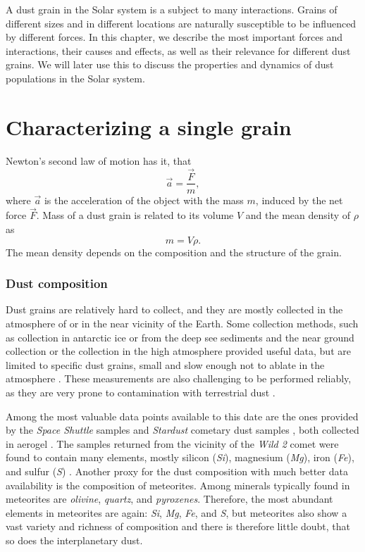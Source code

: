 A dust grain in the Solar system is a subject to many interactions. Grains of different sizes and in different locations are naturally susceptible to be influenced by different forces. In this chapter, we describe the most important forces and interactions, their causes and effects, as well as their relevance for different dust grains. We will later use this to discuss the properties and dynamics of dust populations in the Solar system. 

\section{Characterizing a single grain}

Newton's second law of motion has it, that
\begin{equation}
\vec{a} = \frac{\vec{F}}{m},
\end{equation}
where $\vec{a}$ is the acceleration of the object with the mass $m$, induced by the net force $\vec{F}$. Mass of a dust grain is related to its volume $V$ and the mean density of $\rho$ as
\begin{equation}
    m = V \rho.
\end{equation}
The mean density depends on the composition and the structure of the grain. 

\subsubsection{Dust composition}

Dust grains are relatively hard to collect, and they are mostly collected in the atmosphere of or in the near vicinity of the Earth. Some collection methods, such as collection in antarctic ice or from the deep see sediments \citep{brownlee1985cosmic} and the near ground collection \citep{pettersson1958rate} or the collection in the high atmosphere \citep{fechtig1968results} provided useful data, but are limited to specific dust grains, small and slow enough not to ablate in the atmosphere \cite{vondrak2008chemical}. These measurements are also challenging to be performed reliably, as they are very prone to contamination with terrestrial dust \citep{taylor2016cosmic}. 

Among the most valuable data points available to this date are the ones provided by the \textit{Space Shuttle} samples \citep{mcdonnell1984cosmic} and \textit{Stardust} cometary dust samples \citep{brownlee2014stardust}, both collected in aerogel \citep{tsou1995silica}. The samples returned from the vicinity of the \textit{Wild 2} comet were found to contain many elements, mostly silicon (\textit{Si}), magnesium (\textit{Mg}), iron (\textit{Fe}), and sulfur (\textit{S}) \citep{keller2006infrared}. Another proxy for the dust composition with much better data availability is the composition of meteorites. Among minerals typically found in meteorites are \textit{olivine}, \textit{quartz}, and \textit{pyroxenes}. Therefore, the most abundant elements in meteorites are again: \textit{Si}, \textit{Mg}, \textit{Fe}, and \textit{S}, but meteorites also show a vast variety and richness of composition \citep{anders1964origin} and there is therefore little doubt, that so does the interplanetary dust. 

